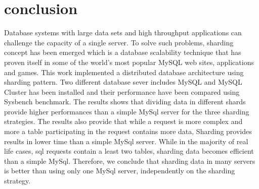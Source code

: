 \documentclass[10pt, conference]{IEEEtran}
\begin{document}
\section{conclusion}
\indent Database systems with large data sets and high throughput applications can challenge the capacity of a single server. To solve such problems, sharding concept has been emerged which is a database scalability technique that has proven itself in some of the world’s most popular MySQL web sites, applications and games. This work implemented a distributed database architecture using sharding pattern. Two different database sever includes MySQL and MySQL Cluster has been installed and their performance have been compared using Sysbench benchmark. The results shows that dividing data in different shards provide higher performances than a simple MySql server for the three sharding strategies. The results also provide that while a request is more complex and more a table participating in the request contains more data, Sharding provides results in lower time than a simple MySql server. While in the majority of real life cases, sql requests contain a least two tables, sharding data becomes efficient than a simple MySql. Therefore, we conclude that sharding data in many servers is better than using only one MySql server, independently on the sharding strategy.


\balance


\end{document}
